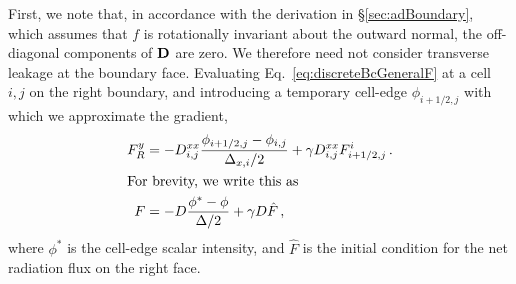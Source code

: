 First, we note that, in accordance with the derivation in
\S\ref{sec:adBoundary}, which assumes that $f$ is rotationally invariant about
the outward normal, the
off-diagonal components of $\mathbf{D}$ are zero. We therefore need not consider
transverse leakage at the boundary face. Evaluating
Eq.~\eqref{eq:discreteBcGeneralF} at a cell $i,j$ on the right boundary, and
introducing a temporary cell-edge $\phi_{i+1/2,j}$ with which we approximate the
gradient,
\begin{align} \nonumber
  F_R^y 
  &= - D_{i,j}^{xx} \frac{\phi_{i+1/2,j} - \phi_{i,j}}{\Delta_{x,i} / 2}
  + \gamma D_{i,j}^{xx} F_{i+1/2,j}^{i} \,.
\\ 
\intertext{For brevity, we write this as}
\label{eq:discreteBcFBrief}
  F
  &= - D \frac{\phi^* - \phi}{\Delta / 2}
  + \gamma D \hat F \,,
\end{align}
where $\phi^*$ is the cell-edge scalar intensity, and $\hat F$ is the initial
condition for the net radiation flux on the right face.

